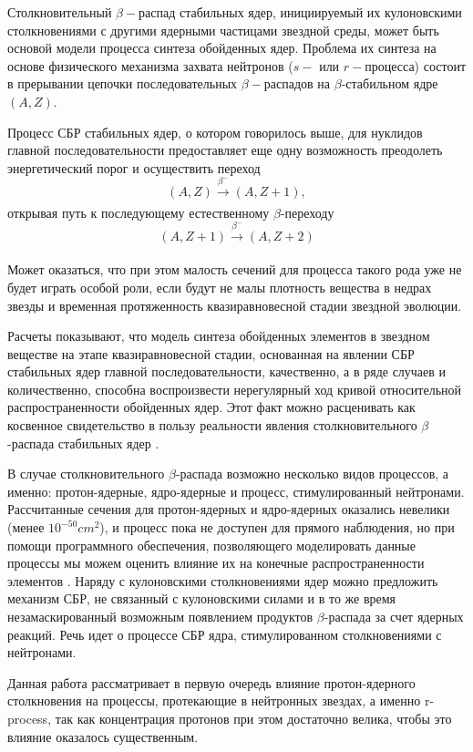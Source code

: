\documentclass[%
master,    %
natbib,      %
subf,        %
href,        %
colorlinks,  %
]{disser}
\begin{document}
Столкновительный $\beta-$распад стабильных ядер, инициируемый их кулоновскими столкновениями с другими ядерными частицами звездной среды, может быть основой модели процесса синтеза обойденных ядер.
Проблема их синтеза на основе физического механизма захвата нейтронов ($s-$ или $r-$процесса) состоит в прерывании цепочки последовательных $\beta-$распадов на $\beta$-стабильном ядре $(A,Z)$.

Процесс СБР стабильных ядер, о котором говорилось выше, для нуклидов главной последовательности предоставляет еще одну возможность преодолеть энергетический порог и осуществить переход 
$$(A,Z) \xrightarrow[]{\beta^-} (A,Z + 1),$$
открывая путь к последующему естественному $\beta$-переходу
$$(A,Z+1) \xrightarrow[]{\beta^-} (A,Z + 2)$$

Может оказаться, что при этом малость сечений для процесса такого рода уже не будет играть особой роли, если будут не малы плотность вещества в недрах звезды и временная протяженность квазиравновесной стадии звездной эволюции.

Расчеты показывают, что модель синтеза обойденных элементов в звездном веществе на этапе квазиравновесной стадии, основанная на явлении СБР стабильных ядер главной последовательности, качественно, а в ряде случаев и количественно, способна воспроизвести нерегулярный ход кривой относительной распространенности обойденных ядер. Этот факт можно расценивать как косвенное свидетельство в пользу реальности явления столкновительного $\beta$-распада стабильных ядер \cite{tak}.

В случае столкновительного $\beta$-распада возможно несколько видов процессов, а именно: протон-ядерные, ядро-ядерные и процесс, стимулированный нейтронами. Рассчитанные сечения для протон-ядерных и ядро-ядерных оказались невелики (менее $10^{-50}cm^2$), и процесс пока не доступен для прямого наблюдения, но при помощи программного обеспечения, позволяющего моделировать данные процессы мы можем оценить влияние их на конечные распространенности элементов \cite{tak_article}. Наряду с кулоновскими столкновениями ядер можно предложить механизм СБР, не связанный с кулоновскими силами и в то же время незамаскированный возможным появлением продуктов $\beta$-распада за счет ядерных реакций. Речь идет о процессе СБР ядра, стимулированном столкновениями с нейтронами.

Данная работа рассматривает в первую очередь влияние протон-ядерного столкновения на процессы, протекающие в нейтронных звездах, а именно r-process, так как концентрация протонов при этом достаточно велика, чтобы это влияние оказалось существенным. 
\end{document}
